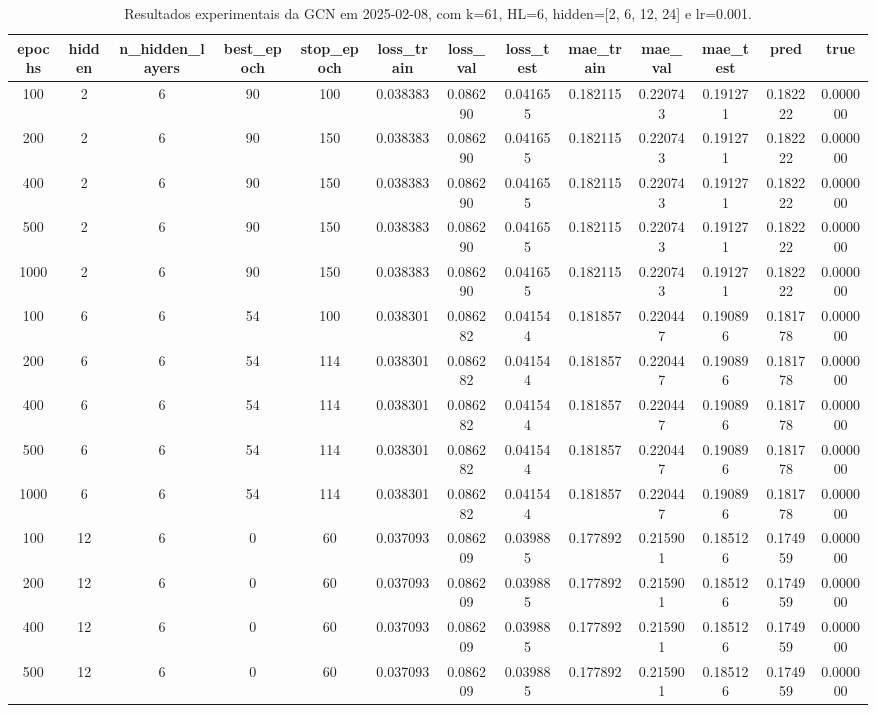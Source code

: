 \begin{table}[h]
\centering
\caption{Resultados experimentais da GCN em 2025-02-08, com k=61, HL=6, hidden=[2, 6, 12, 24] e lr=0.001.}
\label{tab:gcn_results_k61_hl6_d20250208}
\begin{tabular}{ccccccccccccc}
\toprule
epochs & hidden & n\_hidden\_layers & best\_epoch & stop\_epoch & loss\_train & loss\_val & loss\_test & mae\_train & mae\_val & mae\_test & pred & true \\
\midrule
100 & 2 & 6 & 90 & 100 & 0.038383 & 0.086290 & 0.041655 & 0.182115 & 0.220743 & 0.191271 & 0.182222 & 0.000000 \\
200 & 2 & 6 & 90 & 150 & 0.038383 & 0.086290 & 0.041655 & 0.182115 & 0.220743 & 0.191271 & 0.182222 & 0.000000 \\
400 & 2 & 6 & 90 & 150 & 0.038383 & 0.086290 & 0.041655 & 0.182115 & 0.220743 & 0.191271 & 0.182222 & 0.000000 \\
500 & 2 & 6 & 90 & 150 & 0.038383 & 0.086290 & 0.041655 & 0.182115 & 0.220743 & 0.191271 & 0.182222 & 0.000000 \\
1000 & 2 & 6 & 90 & 150 & 0.038383 & 0.086290 & 0.041655 & 0.182115 & 0.220743 & 0.191271 & 0.182222 & 0.000000 \\
100 & 6 & 6 & 54 & 100 & 0.038301 & 0.086282 & 0.041544 & 0.181857 & 0.220447 & 0.190896 & 0.181778 & 0.000000 \\
200 & 6 & 6 & 54 & 114 & 0.038301 & 0.086282 & 0.041544 & 0.181857 & 0.220447 & 0.190896 & 0.181778 & 0.000000 \\
400 & 6 & 6 & 54 & 114 & 0.038301 & 0.086282 & 0.041544 & 0.181857 & 0.220447 & 0.190896 & 0.181778 & 0.000000 \\
500 & 6 & 6 & 54 & 114 & 0.038301 & 0.086282 & 0.041544 & 0.181857 & 0.220447 & 0.190896 & 0.181778 & 0.000000 \\
1000 & 6 & 6 & 54 & 114 & 0.038301 & 0.086282 & 0.041544 & 0.181857 & 0.220447 & 0.190896 & 0.181778 & 0.000000 \\
100 & 12 & 6 & 0 & 60 & 0.037093 & 0.086209 & 0.039885 & 0.177892 & 0.215901 & 0.185126 & 0.174959 & 0.000000 \\
200 & 12 & 6 & 0 & 60 & 0.037093 & 0.086209 & 0.039885 & 0.177892 & 0.215901 & 0.185126 & 0.174959 & 0.000000 \\
400 & 12 & 6 & 0 & 60 & 0.037093 & 0.086209 & 0.039885 & 0.177892 & 0.215901 & 0.185126 & 0.174959 & 0.000000 \\
500 & 12 & 6 & 0 & 60 & 0.037093 & 0.086209 & 0.039885 & 0.177892 & 0.215901 & 0.185126 & 0.174959 & 0.000000 \\

\end{tabular}
\end{table}
